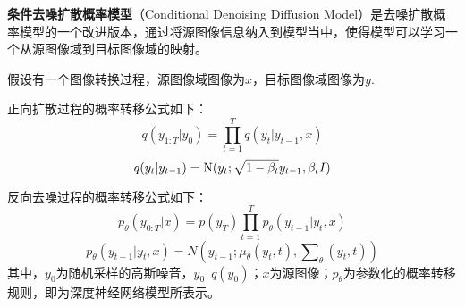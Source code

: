 
\textbf{条件去噪扩散概率模型}（Conditional Denoising Diffusion Model）是去噪扩散概率模型的一个改进版本，通过将源图像信息纳入到模型当中，使得模型可以学习一个从源图像域到目标图像域的映射。

假设有一个图像转换过程，源图像域图像为$x$，目标图像域图像为$y$.

正向扩散过程的概率转移公式如下：
\begin{equation}
q({y_{1:T}}|{y_0}) = \prod\limits_{t = 1}^T {q({y_t}|{y_{t - 1},x})}
\end{equation}
\begin{equation}
q({y_t}|{y_{t - 1}}) = {\rm{N}}({y_t};\sqrt {1 - {\beta _t}} {y_{t - 1}},{\beta _t}I)
\end{equation}

反向去噪过程的概率转移公式如下：
\begin{equation}
{p_\theta }({y_{0:T}|x}) = p({y_T})\prod\limits_{t = 1}^T {{p_\theta }({y_{t - 1}}|{y_t,x})}
\end{equation}
\begin{equation}
{p_\theta }({y_{t - 1}}|{y_t,x}) = N({y_{t - 1}};{\mu _\theta }({y_t},t),\sum\nolimits_\theta  {({y_t},t)} )
\end{equation}
其中，$y_0$为随机采样的高斯噪音，$y_0$~$q(y_0)$；$x$为源图像；$p_\theta$为参数化的概率转移规则，即为深度神经网络模型所表示。